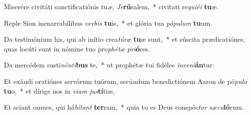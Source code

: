 \item Miserére civitáti sanctificatiónis tu\textit{æ}, \textit{Je}\textbf{rú}salem,~* civitati re\textit{qui}\textit{é}\textit{i} \textbf{tu}æ.
\item Reple Sion inenarrabílibus \textit{ver}\textit{bis} \textbf{tu}is,~* et glória tua \textit{pó}\textit{pu}\textit{lum} \textbf{tu}um.
\item Da testimónium his, qui ab inítio crea\textit{tú}\textit{ræ} \textbf{tu}æ sunt,~* et súscita prædicatiónes, quas locúti sunt in nómine tuo pro\textit{phé}\textit{tæ} \textit{pri}\textbf{ó}res.
\item Da mercédem susti\textit{nén}\textit{ti}\textbf{bus} te,~* ut prophétæ tui fidéles \textit{in}\textit{ve}\textit{ni}\textbf{án}tur:
\item Et exáudi oratiónes servórum tuórum, secúndum benedictiónem Aaron de pó\textit{pu}\textit{lo} \textbf{tu}o,~* et dírige nos in \textit{vi}\textit{am} \textit{jus}\textbf{tí}tiæ,
\item Et sciant omnes, qui há\textit{bi}\textit{tant} \textbf{ter}ram,~* quia tu es Deus conspéc\textit{tor} \textit{sæ}\textit{cu}\textbf{ló}rum.
